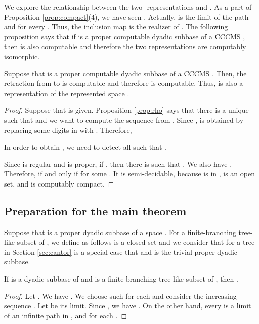 \documentclass{eptcs-modified}
\begin{document}
We explore the relationship between the two -representations
   and .
As a part of Proposition \ref{prop:compact}(4),
we have seen .
Actually,   is the limit of the path
 and  for every .
Thus, the inclusion map 
is the realizer of .   The following proposition says that
if  is a proper computable dyadic subbase of a CCCMS ,
then
 is also computable and therefore
the two representations are computably isomorphic.

\begin{proposition}\label{prop:computable-retract}
  Suppose that  is a proper computable dyadic subbase of a CCCMS .
  Then, the retraction  from  to  is  computable and therefore
 is computable.
Thus,   is also a -representation of the represented space .

\end{proposition}
\begin{proof}
Suppose that  is given.
  Proposition \ref{prop:rho} says that there is a unique  such that 
  and we want to compute the sequence    from .
  Since ,
   is obtained by replacing some digits in  with .
  Therefore,
  
  In order to obtain , we need to detect all  such that .

  Since  is regular and  is proper,  if , then
there is  such that
  .
  We also have .
  Therefore,   if and only if  for some .
  It is semi-decidable, because  is in ,  is an open set, and
   is computably compact.
\end{proof}


\subsection{Preparation for the main theorem}

Suppose that   is a proper dyadic subbase of a space .
For a finite-branching tree-like subset  of , we define
 as follows
 is a closed set and we consider that  for a tree 
in Section \ref{sec:cantor} is a special case that  and  is the trivial proper dyadic subbase.

  \begin{proposition}\label{prop:bracket}
If   is a dyadic subbase of  and  is a finite-branching tree-like subset of , then
  .
\end{proposition}
  \begin{proof}
   Let .  We have .
  We choose such  for each  and consider the increasing sequence .
    Let  be its limit.
    Since ,
    we have .
    On the other hand, every  is a limit of an infinite path  in ,
    and  for each .
\end{proof}
\end{document}
